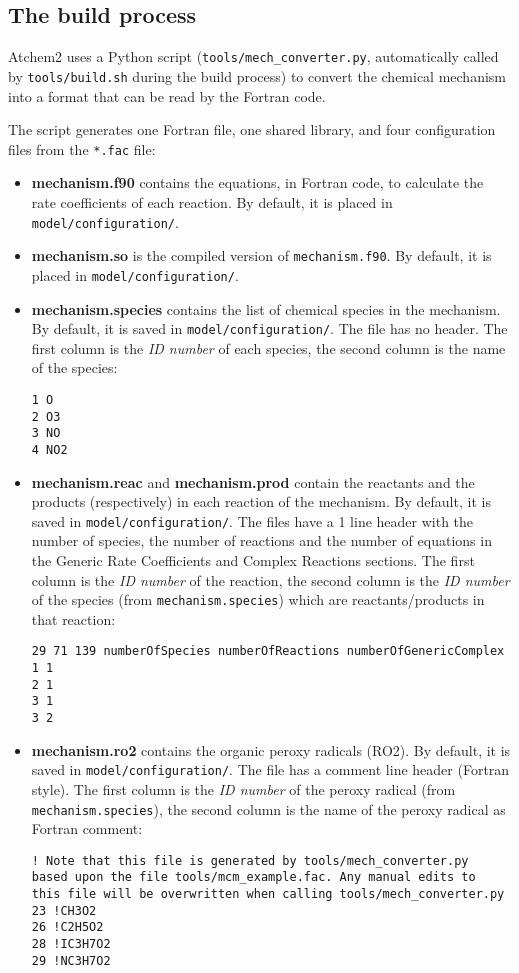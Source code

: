 \subsection{The build process} \label{subsec:the-build-process}

Atchem2 uses a Python script (\texttt{tools/mech\_converter.py},
automatically called by \texttt{tools/build.sh} during the build
process) to convert the chemical mechanism into a format that can be
read by the Fortran code.

The script generates one Fortran file, one shared library, and four
configuration files from the \texttt{*.fac} file:

\begin{itemize}
\item \textbf{mechanism.f90} contains the equations, in Fortran code,
  to calculate the rate coefficients of each reaction. By default, it
  is placed in \texttt{model/configuration/}.
\item \textbf{mechanism.so} is the compiled version of
  \texttt{mechanism.f90}. By default, it is placed in
  \texttt{model/configuration/}.
\item \textbf{mechanism.species} contains the list of chemical species
  in the mechanism. By default, it is saved in
  \texttt{model/configuration/}. The file has no header. The first
  column is the \emph{ID number} of each species, the second column is
  the name of the species:
\begin{verbatim}
1 O
2 O3
3 NO
4 NO2
\end{verbatim}

\item \textbf{mechanism.reac} and \textbf{mechanism.prod} contain the
  reactants and the products (respectively) in each reaction of the
  mechanism. By default, it is saved in \texttt{model/configuration/}.
  The files have a 1 line header with the number of species, the
  number of reactions and the number of equations in the Generic Rate
  Coefficients and Complex Reactions sections. The first column is the
  \emph{ID number} of the reaction, the second column is the \emph{ID
    number} of the species (from \texttt{mechanism.species}) which are
  reactants/products in that reaction:
\begin{verbatim}
29 71 139 numberOfSpecies numberOfReactions numberOfGenericComplex
1 1
2 1
3 1
3 2
\end{verbatim}

\item \textbf{mechanism.ro2} contains the organic peroxy radicals
  (RO2). By default, it is saved in \texttt{model/configuration/}. The
  file has a comment line header (Fortran style). The first column is
  the \emph{ID number} of the peroxy radical (from
  \texttt{mechanism.species}), the second column is the name of the
  peroxy radical as Fortran comment:
\begin{verbatim}
! Note that this file is generated by tools/mech_converter.py
based upon the file tools/mcm_example.fac. Any manual edits to
this file will be overwritten when calling tools/mech_converter.py
23 !CH3O2
26 !C2H5O2
28 !IC3H7O2
29 !NC3H7O2
\end{verbatim}
\end{itemize}


